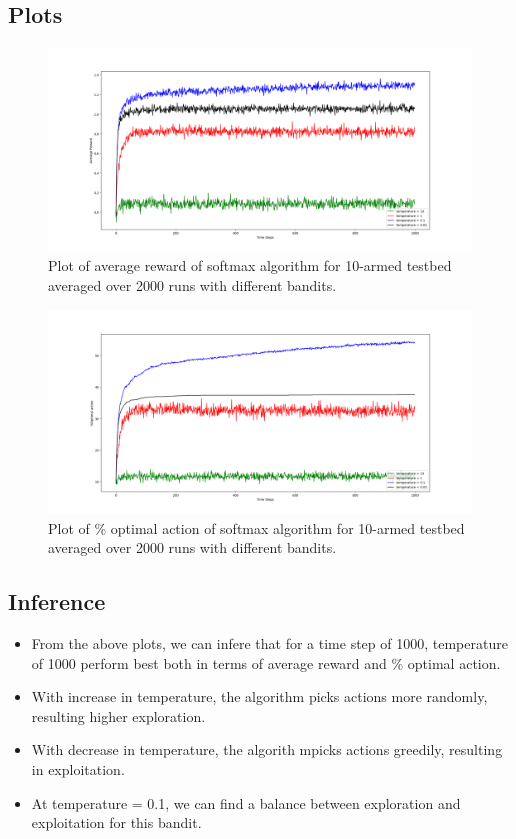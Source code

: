\documentclass[english]{article}
\begin{document}
\subsection{Plots}
\begin{figure}[H]
    \centering
    \includegraphics[width=\linewidth]{softmax_avg_reward_10arms.png}
    \caption{Plot of average reward of softmax algorithm for 10-armed testbed averaged over 2000 runs with different bandits.}
    \label{fig:eg1}
\end{figure}

\begin{figure}[H]
    \centering
    \includegraphics[width=\linewidth]{softmax_opt_action_10arms.png}
    \caption{Plot of \% optimal action of softmax algorithm for 10-armed testbed averaged over 2000 runs with different bandits.}
    \label{fig:eg1}
\end{figure}

\subsection{Inference}
\begin{itemize}
    \item From the above plots, we can infere that for a time step of 1000, temperature of 1000 perform best both in terms of average reward and \% optimal action.
    \item With increase in temperature, the algorithm picks actions more randomly, resulting higher exploration.
    \item With decrease in temperature, the algorith mpicks actions greedily, resulting in exploitation.
    \item At temperature = 0.1, we can find a balance between exploration and exploitation for this bandit. 
\end{itemize}
\pagebreak
\end{document}
